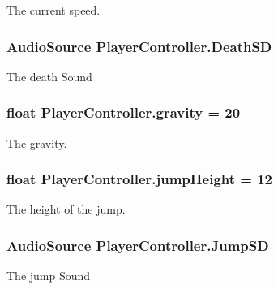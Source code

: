 The current speed. 

\hypertarget{classPlayerController_ac991ebede5b7666a4dcfefbd73114393}{
\subsubsection[{Death\-S\-D}]{\setlength{\rightskip}{0pt plus 5cm}Audio\-Source Player\-Controller.\-Death\-S\-D}}\label{classPlayerController_ac991ebede5b7666a4dcfefbd73114393}


The death Sound 

\hypertarget{classPlayerController_a0a8e0eb9de4ccc5bd5f4cc5b44469b01}{
\subsubsection[{gravity}]{\setlength{\rightskip}{0pt plus 5cm}float Player\-Controller.\-gravity = 20}}\label{classPlayerController_a0a8e0eb9de4ccc5bd5f4cc5b44469b01}


The gravity. 

\hypertarget{classPlayerController_a1f5dfe5afd998f509dbb405800619b6d}{
\subsubsection[{jump\-Height}]{\setlength{\rightskip}{0pt plus 5cm}float Player\-Controller.\-jump\-Height = 12}}\label{classPlayerController_a1f5dfe5afd998f509dbb405800619b6d}


The height of the jump. 

\hypertarget{classPlayerController_a3f516eecb6942aa1ec667de83154d350}{
\subsubsection[{Jump\-S\-D}]{\setlength{\rightskip}{0pt plus 5cm}Audio\-Source Player\-Controller.\-Jump\-S\-D}}\label{classPlayerController_a3f516eecb6942aa1ec667de83154d350}


The jump Sound 

